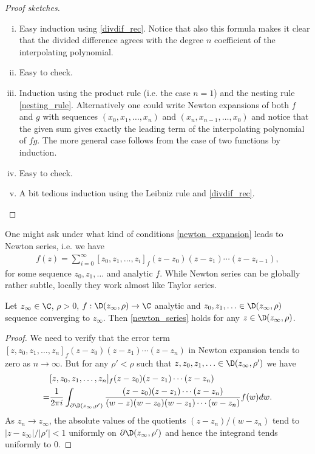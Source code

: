 \begin{proof}[Proof sketches]
	\begin{enumerate}[(i)]
		\item Easy induction using \ref{divdif_rec}. Notice that also this formula makes it clear that the divided difference agrees with the degree $n$ coefficient of the interpolating polynomial.
		\item Easy to check.
		\item Induction using the product rule (i.e. the case $n = 1$) and the nesting rule \ref{nesting_rule}. Alternatively one could write Newton expansions of both $f$ and $g$ with sequences $(x_{0}, x_{1}, \ldots, x_{n})$ and $(x_{n}, x_{n - 1}, \ldots, x_{0})$ and notice that the given sum gives exactly the leading term of the interpolating polynomial of $f g$. The more general case follows from the case of two functions by induction.
		\item Easy to check.
		\item A bit tedious induction using the Leibniz rule and \ref{divdif_rec}.
	\end{enumerate}
\end{proof}

One might ask under what kind of conditions \ref{newton_expansion} leads to Newton series, i.e. we have
\begin{align}\label{newton_series}
	f(z) = \sum_{i = 0}^{\infty} [z_{0}, z_{1}, \ldots, z_{i}]_{f} (z - z_{0}) (z - z_{1}) \cdots (z - z_{i - 1}),
\end{align}
for some sequence $z_{0}, z_{1}, \ldots$ and analytic $f$. While Newton series can be globally rather subtle, locally they work almost like Taylor series.

\begin{prop}
	Let $z_{\infty} \in \C$, $\rho > 0$, $f : \D(z_{\infty}, \rho) \to \C$ analytic and $z_{0}, z_{1}, \ldots \in \D(z_{\infty}, \rho)$ sequence converging to $z_{\infty}$. Then \ref{newton_series} holds for any $z \in \D(z_{\infty}, \rho)$.
\end{prop}
\begin{proof}
	We need to verify that the error term $[z, z_{0}, z_{1}, \ldots, z_{n}]_{f} (z - z_{0}) (z - z_{1}) \cdots (z - z_{n})$ in Newton expansion tends to zero as $n \to \infty$. But for any $\rho' < \rho$ such that $z, z_{0}, z_{1}, \ldots \in \D(z_{\infty}, \rho')$ we have
	\begin{align*}
		&[z, z_{0}, z_{1}, \ldots, z_{n}]_{f} (z - z_{0}) (z - z_{1}) \cdots (z - z_{n}) \\
		= & \frac{1}{2 \pi i} \int_{\partial \D(z_{\infty}, \rho')} \frac{(z - z_{0}) (z - z_{1}) \cdots (z - z_{n})}{(w - z)(w - z_{0}) (w - z_{1}) \cdots (w - z_{n})} f(w) dw.
	\end{align*}
	As $z_{n} \to z_{\infty}$, the absolute values of the quotients $(z - z_{n})/(w - z_{n})$ tend to $|z - z_{\infty}|/|\rho'| < 1$ uniformly on $\partial \D(z_{\infty}, \rho')$ and hence the integrand tends uniformly to $0$.
\end{proof}

